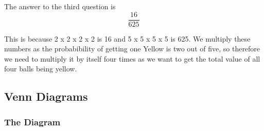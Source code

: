 \documentclass[a4paper,12pt]{article}
\begin{document}
The answer to the third question is $$\frac{16}{625}$$

This is because 2 x 2 x 2 x 2 is 16 and 5 x 5 x 5 x 5 is 625. We multiply these numbers as the probabibility of getting one Yellow is two out of five, so therefore we need to multiply it by itself four times as we want to get the total value of all four balls being yellow.

\newpage

\subsection{Venn Diagrams}

\subsubsection{The Diagram}

\def\firstcircle{(0,0) circle (1.5cm)}
\def\secondcircle{(55:2cm) circle (1.5cm)}
\def\thirdcircle{(0:2cm) circle (1.5cm)}
\def\forthcircle{(5,0.5) circle (1.5cm)}

\end{document}

